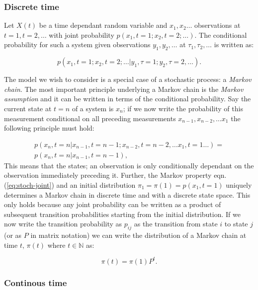 \subsubsection{Discrete time}

Let $X(t)$ be a time dependant random variable and $x_1, x_2 \ldots $ observations at $t=1, t =2, \ldots$ with joint probability $p(x_1, t=1; x_2, t=2; \ldots)$. The conditional probability for such a system given observations $y_1, y_2, \ldots$ at $\tau_1, \tau_2, \ldots $ is written as:

\begin{equation}
  \label{eq:stoch-joint-init}
  p(x_1, t=1; x_2, t=2; \ldots | y_1, \tau=1; y_2,\tau=2, \ldots).
\end{equation}

The model we wish to consider is a special case of a stochastic process: a \emph{Markov chain}. The most important principle underlying a Markov chain is the \emph{Markov assumption} and it can be written in terms of the conditional probability. Say the current state at $t=n$ of a system is $x_n$; if we now write the probability of this measurement conditional on all preceding measurements $x_{n-1}, x_{n-2}, \ldots x_1$ the following principle must hold:

\begin{multline}
  \label{eq:stoch-joint}
  p(x_n, t=n | x_{n-1}, t={n-1}; x_{n-2}, t={n-2}, \ldots x_1, t=1 \ldots) = \\ p(x_{n},t={n}| x_{n-1},t={n-1}),
\end{multline}
This means that the states; an observation is only conditionally dependant on the observation immediately preceding it. Further, the Markov property eqn. (\ref{eq:stoch-joint}) and an initial distribution $\pi_1 = \pi(1) = p(x_1,t=1)$ uniquely determines a Markov chain in discrete time and with a discrete state space. This only holds because any joint probability can be written as a product of subsequent transition probabilities starting from the initial distribution. If we now write the transition probability as $p_{ij}$ as the transition from state $i$ to state $j$ (or as $P$ in matrix notation) we can write the distribution of a Markov chain at time $t$, $\pi(t)$ where $t \in \mathbb{N}$ as:

\begin{equation}
  \label{eq:markov-chain}
  \pi(t) = \pi(1)P^t.
\end{equation}

\subsubsection{Continous time}
\label{sec:continous-time}

